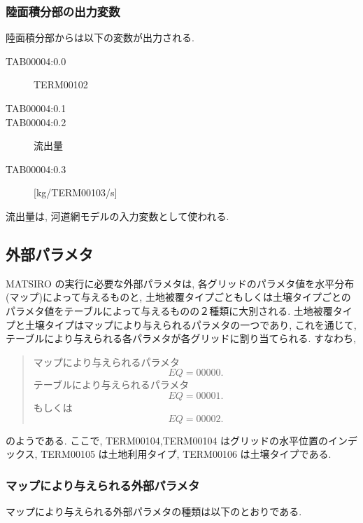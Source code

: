\medskip

\subsubsection{陸面積分部の出力変数}

陸面積分部からは以下の変数が出力される.

\begin{description}
\item[TAB00004:0.0] TERM00102
\item[TAB00004:0.1] 
\item[TAB00004:0.2] 流出量
\item[TAB00004:0.3] [kg/TERM00103/s]
\end{description}
\medskip

流出量は, 河道網モデルの入力変数として使われる.

\subsection{外部パラメタ}

MATSIRO の実行に必要な外部パラメタは, 各グリッドのパラメタ値を水平分布
(マップ)によって与えるものと, 土地被覆タイプごともしくは土壌タイプごとの
パラメタ値をテーブルによって与えるものの２種類に大別される. 土地被覆タイ
プと土壌タイプはマップにより与えられるパラメタの一つであり, これを通じて,
テーブルにより与えられる各パラメタが各グリッドに割り当てられる. すなわち,
\begin{quote}
 マップにより与えられるパラメタ
 \[
EQ=00000.
\]
 テーブルにより与えられるパラメタ
 \[
EQ=00001.
\]
もしくは
 \[
EQ=00002.
\]
\end{quote}
のようである. ここで, TERM00104,TERM00104 はグリッドの水平位置のインデックス, TERM00105
は土地利用タイプ, TERM00106 は土壌タイプである.

\subsubsection{マップにより与えられる外部パラメタ}

マップにより与えられる外部パラメタの種類は以下のとおりである.

